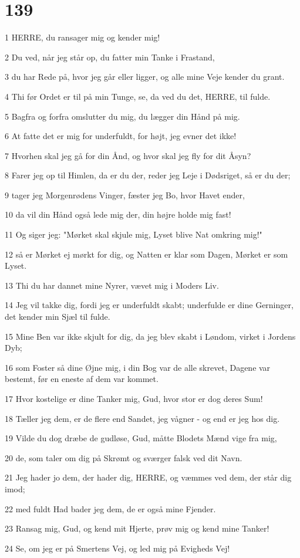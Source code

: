 \chapter{139}

\par 1 HERRE, du ransager mig og kender mig!
\par 2 Du ved, når jeg står op, du fatter min Tanke i Frastand,
\par 3 du har Rede på, hvor jeg går eller ligger, og alle mine Veje kender du grant.
\par 4 Thi før Ordet er til på min Tunge, se, da ved du det, HERRE, til fulde.
\par 5 Bagfra og forfra omslutter du mig, du lægger din Hånd på mig.
\par 6 At fatte det er mig for underfuldt, for højt, jeg evner det ikke!
\par 7 Hvorhen skal jeg gå for din Ånd, og hvor skal jeg fly for dit Åsyn?
\par 8 Farer jeg op til Himlen, da er du der, reder jeg Leje i Dødsriget, så er du der;
\par 9 tager jeg Morgenrødens Vinger, fæster jeg Bo, hvor Havet ender,
\par 10 da vil din Hånd også lede mig der, din højre holde mig fast!
\par 11 Og siger jeg: "Mørket skal skjule mig, Lyset blive Nat omkring mig!"
\par 12 så er Mørket ej mørkt for dig, og Natten er klar som Dagen, Mørket er som Lyset.
\par 13 Thi du har dannet mine Nyrer, vævet mig i Moders Liv.
\par 14 Jeg vil takke dig, fordi jeg er underfuldt skabt; underfulde er dine Gerninger, det kender min Sjæl til fulde.
\par 15 Mine Ben var ikke skjult for dig, da jeg blev skabt i Løndom, virket i Jordens Dyb;
\par 16 som Foster så dine Øjne mig, i din Bog var de alle skrevet, Dagene var bestemt, før en eneste af dem var kommet.
\par 17 Hvor kostelige er dine Tanker mig, Gud, hvor stor er dog deres Sum!
\par 18 Tæller jeg dem, er de flere end Sandet, jeg vågner - og end er jeg hos dig.
\par 19 Vilde du dog dræbe de gudløse, Gud, måtte Blodets Mænd vige fra mig,
\par 20 de, som taler om dig på Skrømt og sværger falsk ved dit Navn.
\par 21 Jeg hader jo dem, der hader dig, HERRE, og væmmes ved dem, der står dig imod;
\par 22 med fuldt Had bader jeg dem, de er også mine Fjender.
\par 23 Ransag mig, Gud, og kend mit Hjerte, prøv mig og kend mine Tanker!
\par 24 Se, om jeg er på Smertens Vej, og led mig på Evigheds Vej!

